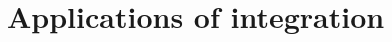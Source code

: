 \documentclass[../book/calcnotes.tex]{subfiles}
\begin{document}
\chapter{Applications of integration}
\label{ch:integral-applications}



%

\end{document}
